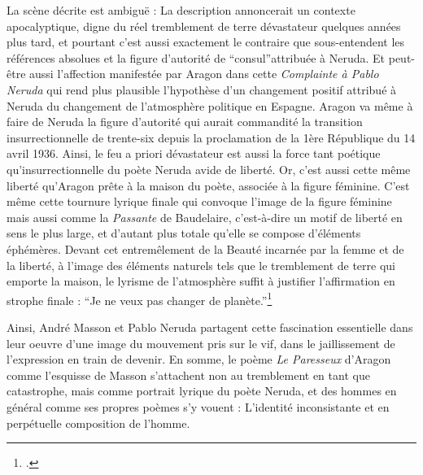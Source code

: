 	La scène décrite est ambiguë : La description annoncerait un contexte apocalyptique, digne du réel tremblement de terre dévastateur quelques années plus tard, et pourtant c’est aussi exactement le contraire que sous-entendent les références absolues et la figure d’autorité de \enquote{consul}attribuée à Neruda. Et peut-être aussi l’affection manifestée par Aragon dans cette \emph{Complainte à Pablo Neruda} qui rend plus plausible l’hypothèse d’un changement positif attribué à Neruda du changement de l’atmosphère politique en Espagne. Aragon va même à faire de Neruda la figure d’autorité qui aurait commandité la transition insurrectionnelle de trente-six depuis la proclamation de la 1ère République du 14 avril 1936. Ainsi, le feu a priori dévastateur est aussi la force tant poétique qu’insurrectionnelle du poète Neruda avide de liberté. Or, c’est aussi cette même liberté qu’Aragon prête à la maison du poète, associée à la figure féminine. C’est même cette tournure lyrique finale qui convoque l’image de la figure féminine mais aussi comme la \emph{Passante} de Baudelaire, c’est-à-dire un motif de liberté en sens le plus large, et d’autant plus totale qu’elle se compose d’éléments éphémères. Devant cet entremêlement de la Beauté incarnée par la femme et de la liberté, à l’image des éléments naturels tels que le tremblement de terre qui emporte la maison, le lyrisme de l’atmosphère suffit à justifier l’affirmation en strophe finale : \enquote{Je ne veux pas changer de planète.}\footcite{pabloneruda}

Ainsi, André Masson et Pablo Neruda partagent cette fascination essentielle dans leur oeuvre d’une image du mouvement pris sur le vif, dans le jaillissement de l’expression en train de devenir. En somme, le poème \emph{Le Paresseux} d’Aragon comme l’esquisse de Masson s’attachent non au tremblement en tant que catastrophe, mais comme portrait lyrique du poète Neruda, et des hommes en général comme ses propres poèmes s’y vouent : L’identité inconsistante et en perpétuelle composition de l’homme.

